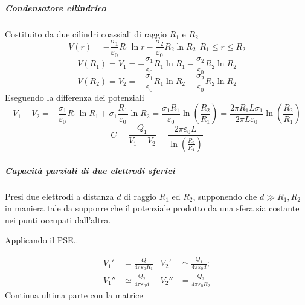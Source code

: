 \subparagraph{Condensatore cilindrico}
Costituito da due cilindri coassiali di raggio $R_1$ e $R_2$
$$
V(r) = -\frac{\sigma_1}{\varepsilon_0}R_1 \ln r - \frac{\sigma_2}{\varepsilon_0}R_2 \ln R_2\ \ R_1\leq r \leq R_2
$$
$$
V(R_1) = V_1 = -\frac{\sigma_1}{\varepsilon_0} R_1 \ln R_1 - \frac{\sigma_2}{\varepsilon_0}R_2 \ln R_2
$$
$$
V(R_2) = V_2 = -\frac{\sigma_1}{\varepsilon_0} R_1 \ln R_2 - \frac{\sigma_2}{\varepsilon_0}R_2 \ln R_2
$$
Eseguendo la differenza dei potenziali
$$
V_1 - V_2 = -\frac{\sigma_1}{\varepsilon_0} R_1 \ln R_1 + \sigma_1\frac{R_1}{\varepsilon_0}\ln R_2
= \frac{\sigma_1 R_1}{\varepsilon_0}\ln\left(\frac{R_2}{R_1}\right) = \frac{2 \pi R_1 L \sigma_1}{2 \pi L \varepsilon_0}\ln \left(\frac{R_2}{R_1}\right)
$$
$$
C = \frac{Q_1}{V_1-V_2} = \frac{2 \pi \varepsilon_0 L }{\ln \left(\frac{R_2}{R_1}\right)}
$$

\subparagraph{Capacità parziali di due elettrodi sferici}
Presi due elettrodi a distanza $d$ di raggio $R_1$ ed $R_2$, supponendo che $d \gg R_1,R_2$
in maniera tale da supporre che il potenziale prodotto da una sfera sia costante nei punti 
occupati dall'altra.

Applicando il PSE..

\begin{align*}
V_1' &= \frac{Q}{4 \pi \varepsilon_0 R_1}& V_2' &\simeq \frac{Q_1}{4 \pi \varepsilon_0 d};\\
V_1'' &\simeq \frac{Q_2}{4 \pi \varepsilon_0 d}& V_2'' &= \frac{Q_2}{4 \pi \varepsilon_0 R_2}
\end{align*}
Continua ultima parte con la matrice
